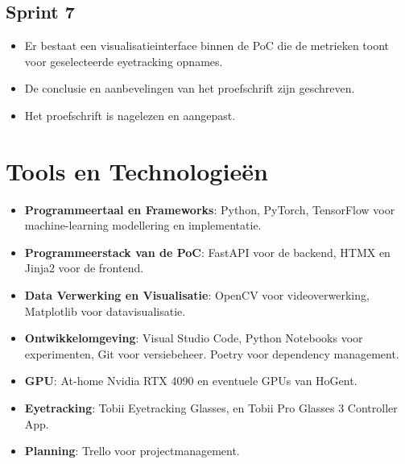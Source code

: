 \subsection{Sprint 7}
\begin{itemize}
    \item Er bestaat een visualisatieinterface binnen de PoC die de metrieken toont voor geselecteerde eyetracking opnames.
    \item De conclusie en aanbevelingen van het proefschrift zijn geschreven.
    \item Het proefschrift is nagelezen en aangepast.
\end{itemize}    

\section{Tools en Technologieën}

\begin{itemize} 
  \item \textbf{Programmeertaal en Frameworks}: Python, PyTorch, TensorFlow voor machine-learning modellering en implementatie. 
  \item \textbf{Programmeerstack van de PoC}: FastAPI voor de backend, HTMX en Jinja2 voor de frontend.
  \item \textbf{Data Verwerking en Visualisatie}: OpenCV voor videoverwerking, Matplotlib voor datavisualisatie. 
  \item \textbf{Ontwikkelomgeving}: Visual Studio Code, Python Notebooks voor experimenten, Git voor versiebeheer. Poetry voor dependency management.
  \item \textbf{GPU}: At-home Nvidia RTX 4090 en eventuele GPUs van HoGent.
  \item \textbf{Eyetracking}: Tobii Eyetracking Glasses, en Tobii Pro Glasses 3 Controller App.
  \item \textbf{Planning}: Trello voor projectmanagement.
\end{itemize}
